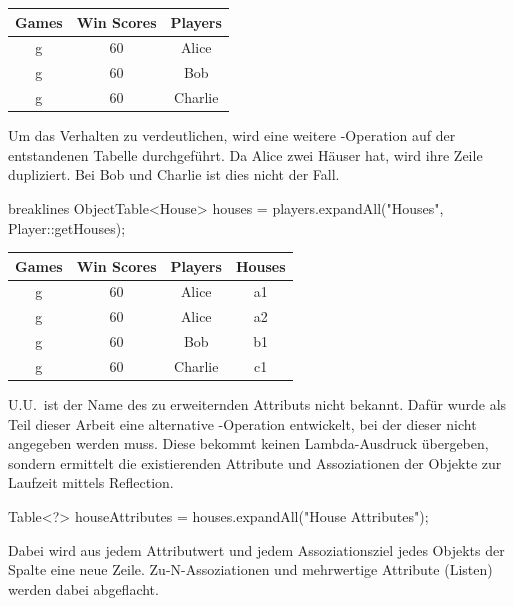 \begin{tabular}{|c|c|c|}
    \hline
    \textbf{Games} & \textbf{Win Scores} & \textbf{Players} \\
    \hline
    g & 60 & Alice   \\
    g & 60 & Bob     \\
    g & 60 & Charlie \\
    \hline
\end{tabular}

Um das Verhalten zu verdeutlichen, wird eine weitere -Operation auf der entstandenen Tabelle durchgeführt.
Da Alice zwei Häuser hat, wird ihre Zeile dupliziert.
Bei Bob und Charlie ist dies nicht der Fall.

\begin{jcodeblock*}{breaklines}
    ObjectTable<House> houses = players.expandAll("Houses", Player::getHouses);
\end{jcodeblock*}

\begin{tabular}{|c|c|c|c|}
    \hline
    \textbf{Games} & \textbf{Win Scores} & \textbf{Players} & \textbf{Houses} \\
    \hline
    g & 60 & Alice   & a1 \\
    g & 60 & Alice   & a2 \\
    g & 60 & Bob     & b1 \\
    g & 60 & Charlie & c1 \\
    \hline
\end{tabular}

U.U.\ ist der Name des zu erweiternden Attributs nicht bekannt.
Dafür wurde als Teil dieser Arbeit eine alternative -Operation entwickelt,
bei der dieser nicht angegeben werden muss.
Diese bekommt keinen Lambda-Ausdruck übergeben, sondern ermittelt die existierenden Attribute und Assoziationen der Objekte zur Laufzeit mittels Reflection.

\begin{jcodeblock}
    Table<?> houseAttributes = houses.expandAll("House Attributes");
\end{jcodeblock}

Dabei wird aus jedem Attributwert und jedem Assoziationsziel jedes Objekts der Spalte  eine neue Zeile.
Zu-N-Assoziationen und mehrwertige Attribute (Listen) werden dabei abgeflacht.

